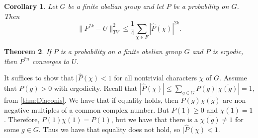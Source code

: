 \documentclass[]{article}
\newtheorem{theorem}{Theorem}
\newtheorem{corollary}[theorem]{Corollary}
\theoremstyle{definition}
\numberwithin{theorem}{section}
\numberwithin{equation}{section}
\begin{document}
\begin{corollary}
	\label{cor:Convolution Inequality}
	Let $G$ be a finite abelian group and let $P$ be a probability on $G$. Then 
	\begin{equation}
	\|P^{\ast k} - U\|^2_{TV} \leq \frac{1}{4} \sum_{\chi \in F} |\widehat{P}(\chi)|^{2k}.
\end{equation}
\end{corollary}

\begin{theorem}
	If $P$ is a probability on a finite abelian group $G$ and $P$ is ergodic, then $P^{\ast n}$ converges to $U$.
\end{theorem}
It suffices to show that $|\widehat{P}(\chi) < 1$ for all nontrivial characters $\chi$ of $G$. Assume that $P(g) > 0$ with ergodicity. Recall that $|\widehat{P}(\chi)|\leq \sum_{g \in G} P(g) |\overline{\chi(g)}| = 1$, from \cref{thm:Diaconis}. We have that if equality holds, then $P(g) \overline{\chi(g)}$ are non-negative multiples of a common complex number. But $P(1) \geq 0$ and $\overline{\chi(1)} = 1$. Therefore, $P(1) \overline{\chi(1)} = P(1)$, but we have that there is a $\overline{\chi(g)} \neq 1$ for some $g \in G$. Thus we have that equality does not hold, so $|\widehat{P}(\chi) < 1$. 
\end{document}
